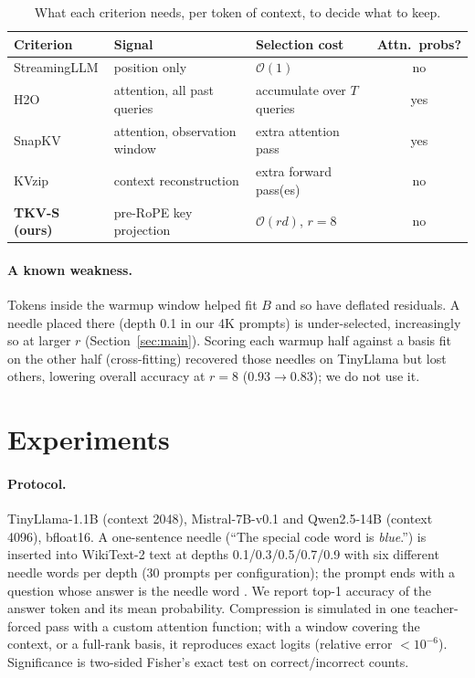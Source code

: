 \documentclass{article}
\begin{document}
\begin{table}[t]
\centering
\caption{What each criterion needs, per token of context, to decide what to keep.}
\label{tab:cost}
\small
\setlength{\tabcolsep}{3pt}
\begin{tabular}{lllc}
\toprule
Criterion & Signal & Selection cost & Attn.\ probs? \\
\midrule
StreamingLLM & position only & $\mathcal{O}(1)$ & no \\
H2O & attention, all past queries & accumulate over $T$ queries & yes \\
SnapKV & attention, observation window & extra attention pass & yes \\
KVzip \citep{kvzip2025} & context reconstruction & extra forward pass(es) & no \\
\textbf{TKV-S (ours)} & pre-RoPE key projection & $\mathcal{O}(rd)$, $r{=}8$ & no \\
\bottomrule
\end{tabular}
\end{table}

\paragraph{A known weakness.} Tokens inside the warmup window helped fit $B$
and so have deflated residuals. A needle placed there (depth 0.1 in our 4K
prompts) is under-selected, increasingly so at larger $r$
(Section~\ref{sec:main}). Scoring each warmup half against a basis fit on the
other half (cross-fitting) recovered those needles on TinyLlama but lost
others, lowering overall accuracy at $r{=}8$ (0.93$\to$0.83); we do not use it.

\section{Experiments}
\label{sec:results}

\paragraph{Protocol.}
TinyLlama-1.1B (context 2048), Mistral-7B-v0.1 \citep{mistral2023} and
Qwen2.5-14B \citep{qwen25} (context 4096), bfloat16. A one-sentence needle
(``The special code word is \emph{blue}.'') is inserted into WikiText-2 text
\citep{merity2017} at depths 0.1/0.3/0.5/0.7/0.9 with six different needle
words per depth (30 prompts per configuration); the prompt ends with a
question whose answer is the needle word \citep{niah2023}. We report top-1
accuracy of the answer token and its mean probability. Compression is
simulated in one teacher-forced pass with a custom attention function; with a
window covering the context, or a full-rank basis, it reproduces exact
logits (relative error $<10^{-6}$). Significance is two-sided Fisher's exact
test on correct/incorrect counts.
\end{document}

